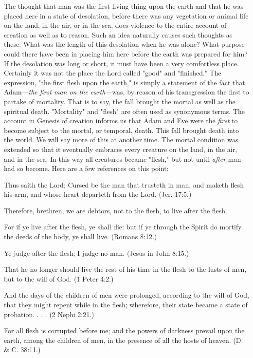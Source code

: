 The thought that man was the first living thing upon the earth and that he was placed here in
a state of desolation, before there was any vegetation or animal life on the land, in the air, or
in the sea, does violence to the entire account of creation as well as to reason. Such an idea
naturally causes such thoughts as these: What was the length of this desolation when he was
alone? What purpose could there have been in placing him here before the earth was
prepared for him? If the desolation was long or short, it must have been a very comfortless
place. Certainly it was not the place the Lord called "good" and "finished." The expression,
"the first flesh upon the earth," is simply a statement of the fact that Adam—\textit{the first man on
the earth}—was, by reason of his transgression the first to partake of mortality. That is to say,
the fall brought the mortal as well as the spiritual death. "Mortality" and "flesh" are often
used as synonymous terms. The account in Genesis of creation informs us that Adam and
Eve were the \textit{first} to become subject to the mortal, or temporal, death. This fall brought death
into the world. We will say more of this at another time. The mortal condition was extended
so that it eventually embraces every creature on the land, in the air, and in the sea. In this way
all creatures became "flesh," but not until \textit{after} man had so become. Here are a few
references on this point:

Thus saith the Lord; Cursed be the man that trusteth in man, and maketh flesh his arm, and
whose heart departeth from the Lord. (Jer. 17:5.)

Therefore, brethren, we are debtors, not to the flesh, to live after the flesh.

For if ye live after the flesh, ye shall die: but if ye through the Spirit do mortify the deeds of
the body, ye shall live. (Romans 8:12.)

Ye judge after the flesh; I judge no man. (Jesus in John 8:15.)

That he no longer should live the rest of his time in the flesh to the lusts of men, but to the
will of God. (1 Peter 4:2.)

And the days of the children of men were prolonged, according to the will of God, that they
might repent while in the flesh; wherefore, their state became a state of probation. . . . (2
Nephi 2:21.)

For all flesh is corrupted before me; and the powers of darkness prevail upon the earth,
among the children of men, in the presence of all the hosts of heaven. (D. \& C. 38:11.)

